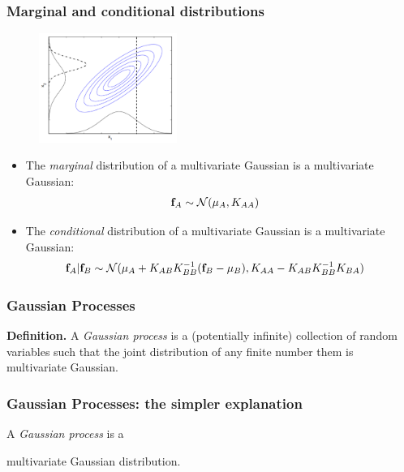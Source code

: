 \documentclass{beamer}
\begin{document}
\begin{frame}
    \frametitle{Marginal and conditional distributions}

    \begin{figure}
    \includegraphics[width=0.4\textwidth]{./figures/mg.png}
    \end{figure}

        \begin{itemize}
            \item The {\it marginal} distribution of a multivariate Gaussian is a multivariate Gaussian:
            \begin{align*}
                &{\mathbf{f}_A}  \sim {\cal N}(\mu_A, K_{AA})
            \end{align*}

            \item The {\it conditional} distribution of a multivariate Gaussian is a multivariate Gaussian:
            \begin{align*}
                &{\mathbf{f}_A}|{\mathbf{f}_B}  \sim {\cal N}(\mu_A + K_{AB}K_{BB}^{-1}({\mathbf{f}_B} - \mu_B), K_{AA} - K_{AB}K_{BB}^{-1}K_{BA})
            \end{align*}
        \end{itemize}
\end{frame}


\begin{frame}
    \frametitle{Gaussian Processes}

    {\bf Definition.} A {\it Gaussian process} is a (potentially infinite) collection
    of random variables such that the joint distribution of any finite
    number them is multivariate Gaussian.
\end{frame}


\begin{frame}
    \frametitle{Gaussian Processes: the simpler explanation}

    \begin{center}
        A {\it Gaussian process} is a

        \vspace{1cm}


        \vspace{1cm}


        multivariate Gaussian distribution.
    \end{center}
\end{frame}
\end{document}
